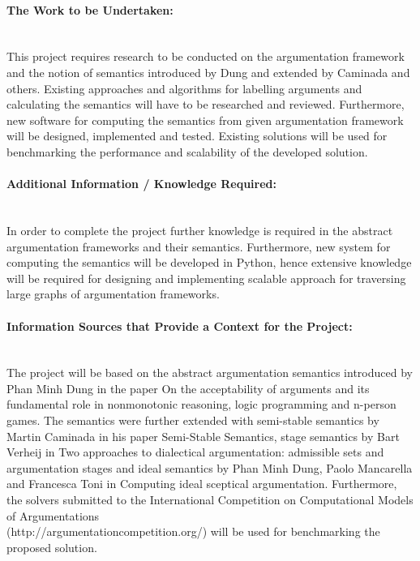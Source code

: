 \paragraph{The Work to be Undertaken:} \mbox{}\\
This project requires research to be conducted on the argumentation framework and the notion of semantics introduced by Dung and extended by Caminada and others. Existing approaches and algorithms for labelling arguments and calculating the semantics will have to be researched and reviewed. Furthermore, new software for computing the semantics from given argumentation framework will be designed, implemented and tested. Existing solutions will be used for benchmarking the performance and scalability of the developed solution.

\paragraph{Additional Information / Knowledge Required:} \mbox{}\\
In order to complete the project further knowledge is required in the abstract argumentation frameworks and their semantics. Furthermore, new system for computing the semantics will be developed in Python, hence extensive knowledge will be required for designing and implementing scalable approach for traversing large graphs of argumentation frameworks. 

\paragraph{Information Sources that Provide a Context for the Project:} \mbox{}\\
The project will be based on the abstract argumentation semantics introduced by Phan Minh Dung in the paper On the acceptability of arguments and its fundamental role in nonmonotonic reasoning, logic programming and n-person games. The semantics were further extended with semi-stable semantics by Martin Caminada in his paper Semi-Stable Semantics, stage semantics by Bart Verheij in Two approaches to dialectical argumentation: admissible sets and argumentation stages and ideal semantics by Phan Minh Dung, Paolo Mancarella and Francesca Toni in Computing ideal sceptical argumentation. Furthermore, the solvers submitted to the International Competition on Computational Models of Argumentations \\ (http://argumentationcompetition.org/) will be used for benchmarking the proposed solution. 

